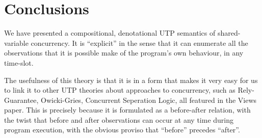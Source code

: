 \section{Conclusions}\label{sec:conc}

We have presented a compositional, denotational UTP semantics
of shared-variable concurrency.
It is ``explicit'' in the sense that it can enumerate all the observations
that it is possible make of the program's own behaviour, in any time-slot.

The usefulness of this theory is that it is in a form that makes it very
easy for us to link it to other UTP theories about approaches to concurrency,
such as Rely-Guarantee\cite{DBLP:phd/ethos/Jones81,On-RG:vanStaden15},
Owicki-Gries\cite{DBLP:journals/acta/OwickiG76},
Concurrent Seperation Logic\cite{DBLP:journals/entcs/Brookes11},
all featured in the Views paper.
This is precisely because it is formulated as a before-after relation,
with the twist that before and after observations can occur at any time
during program execution, with the obvious proviso that
``before'' precedes ``after''.


